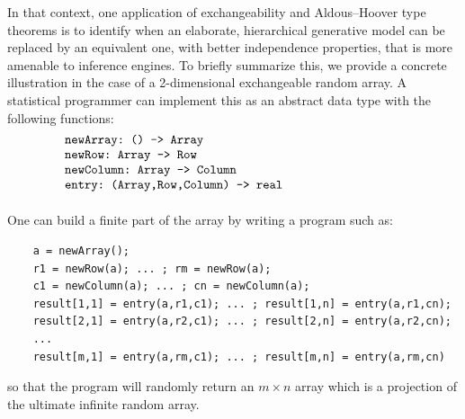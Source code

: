 \documentclass[10pt]{amsart}
\theoremstyle{definition}\newtheorem{defi}[theo]{Definition}\newtheorem{rema}[theo]{Remark}\newtheorem{exam}[theo]{Example}\newtheorem{exem}[theo]{Example}\newtheorem{nota}[theo]{Notation}
\begin{document}
In that context, one application of exchangeability and Aldous--Hoover type theorems is to identify when an elaborate, hierarchical generative model can be replaced by an equivalent one, with better independence properties, that is more amenable to inference engines. To briefly summarize this, we provide a concrete illustration in the case of a 2-dimensional exchangeable random array. A statistical programmer can implement this as an abstract data type with the following functions:
{\small
\begin{equation}\label{eqn:datatype}
\begin{minipage}{0.9\linewidth}
\begin{verbatim}
	newArray: () -> Array
	newRow: Array -> Row
	newColumn: Array -> Column
	entry: (Array,Row,Column) -> real
	\end{verbatim}
\end{minipage}
\end{equation}
}
One can build a finite part of the array by writing a program such as:
{\small
\begin{verbatim}
	a = newArray();
	r1 = newRow(a); ... ; rm = newRow(a);
	c1 = newColumn(a); ... ; cn = newColumn(a);
	result[1,1] = entry(a,r1,c1); ... ; result[1,n] = entry(a,r1,cn);
	result[2,1] = entry(a,r2,c1); ... ; result[2,n] = entry(a,r2,cn);
	... 
	result[m,1] = entry(a,rm,c1); ... ; result[m,n] = entry(a,rm,cn)
\end{verbatim}}
so that the program will randomly return an $m\times n$ array which is a projection of the ultimate infinite random array.
\end{document}

